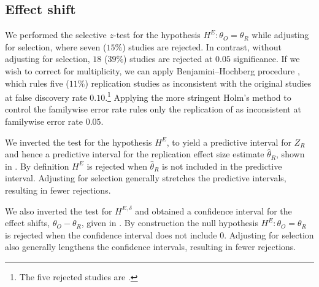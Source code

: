 \documentclass[aoas, preprint]{imsart}
\theoremstyle{definition}
\theoremstyle{custom}
\newcommand{\htheta}{\hat{\theta}}
\begin{document}
\subsection{Effect shift}

  We performed the selective $z$-test for the hypothesis $H^E: \theta_O = \theta_R$ while adjusting for selection, where seven ($15\%$) studies are rejected. In contrast, without adjusting for selection, $18$ ($39\%$) studies are rejected at $0.05$ significance. If we wish to correct for multiplicity, we can apply Benjamini--Hochberg procedure \citeyearpar{Benjamini:1995cd}, which rules five ($11\%$) replication studies as inconsistent with the original studies at false discovery rate $0.10$.\footnote{The five rejected studies are \citet{Dodson:2008ks,vanDijk:2008br,PurdieVaughns:2008en,Farris:2008ev,Larsen:2008tu}.} Applying the more stringent Holm's method \citeyearpar{Holm:1979hl} to control the familywise error rate rules only the replication of \citet{Farris:2008ev} as inconsistent at familywise error rate $0.05$.

  We inverted the test for the hypothesis $H^E$, to yield a predictive interval for $Z_R$ and hence a predictive interval for the replication effect size estimate $\htheta_R$, shown in . By definition $H^E$ is rejected when $\htheta_R$ is not included in the predictive interval. Adjusting for selection generally stretches the predictive intervals, resulting in fewer rejections.

  We also inverted the test for $H^{E,\delta}$ and obtained a confidence interval for the effect shifts, $\theta_O - \theta_R$, given in . By construction the null hypothesis $H^E: \theta_O = \theta_R$ is rejected when the confidence interval does not include $0$. Adjusting for selection also generally lengthens the confidence intervals, resulting in fewer rejections.
\end{document}
